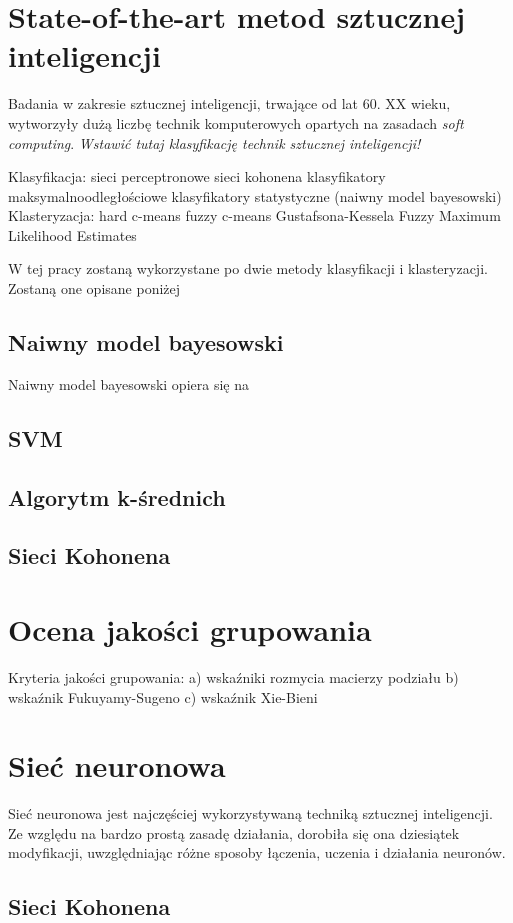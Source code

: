 \documentclass[12pt,a4paper,oneside]{report} %
\begin{document}
\section{State-of-the-art metod sztucznej inteligencji}
Badania w zakresie sztucznej inteligencji, trwające od lat 60. XX wieku, wytworzyły dużą liczbę technik komputerowych opartych na zasadach \emph{soft computing}. \emph{Wstawić tutaj klasyfikację technik sztucznej inteligencji!}\par

Klasyfikacja:
    sieci perceptronowe
    sieci kohonena
    klasyfikatory maksymalnoodległościowe
    klasyfikatory statystyczne (naiwny model bayesowski)
Klasteryzacja:
    hard c-means
    fuzzy c-means
    Gustafsona-Kessela
    Fuzzy Maximum Likelihood Estimates

W tej pracy zostaną wykorzystane po dwie metody klasyfikacji i klasteryzacji. Zostaną one opisane poniżej

\subsection{Naiwny model bayesowski}
Naiwny model bayesowski opiera się na 
\subsection{SVM}
\subsection{Algorytm k-średnich}
\subsection{Sieci Kohonena}

\section{Ocena jakości grupowania}
Kryteria jakości grupowania:
    a) wskaźniki rozmycia macierzy podziału
    b) wskaźnik Fukuyamy-Sugeno
    c) wskaźnik Xie-Bieni
\section{Sieć neuronowa}
Sieć neuronowa jest najczęściej wykorzystywaną techniką sztucznej inteligencji. Ze względu na bardzo prostą zasadę działania, dorobiła się ona dziesiątek modyfikacji, uwzględniając różne sposoby łączenia, uczenia i działania neuronów.
\subsection{Sieci Kohonena}
\end{document}
